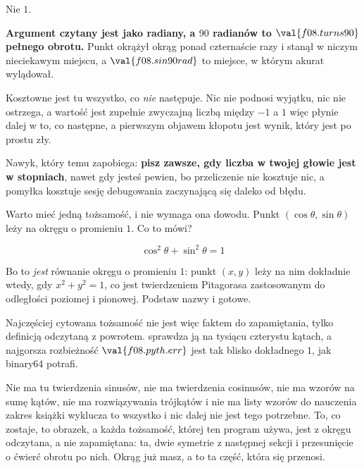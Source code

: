 \begin{fr}
Nie $1$.

\begin{trapbox}
\textbf{Argument czytany jest jako radiany, a $90$ radianów to
$\val{f08.turns90}$ pełnego obrotu.} Punkt okrążył okrąg ponad czternaście
razy i stanął w niczym nieciekawym miejscu, a $\val{f08.sin90rad}$ to
miejsce, w którym akurat wylądował.

Kosztowne jest tu wszystko, co \emph{nie} następuje. Nic nie podnosi wyjątku,
nic nie ostrzega, a wartość jest zupełnie zwyczajną liczbą między $-1$ a $1$
\dash{} więc płynie dalej w to, co następne, a pierwszym objawem kłopotu jest
wynik, który jest po prostu zły.

Nawyk, który temu zapobiega: \textbf{pisz  zawsze, gdy
liczba w twojej głowie jest w stopniach}, nawet gdy jesteś pewien, bo
przeliczenie nie kosztuje nic, a pomyłka kosztuje sesję debugowania
zaczynającą się daleko od błędu.

\end{trapbox}

Warto mieć jedną tożsamość, i nie wymaga ona dowodu. Punkt $(\cos\theta,
\sin\theta)$ leży na okręgu o promieniu $1$. Co to mówi?
\nextframe
\end{fr}

\begin{fr}
\begin{ansblock}
\[ \cos^{2}\theta + \sin^{2}\theta = 1 \]
\end{ansblock}

Bo to \emph{jest} równanie okręgu o promieniu $1$: punkt $(x, y)$ leży na nim
dokładnie wtedy, gdy $x^{2} + y^{2} = 1$, co jest twierdzeniem Pitagorasa
zastosowanym do odległości poziomej i pionowej. Podstaw nazwy i gotowe.

Najczęściej cytowana tożsamość nie jest więc faktem do zapamiętania, tylko
definicją odczytaną z powrotem.
 sprawdza ją na tysiącu czterystu kątach, a
najgorsza rozbieżność $\val{f08.pyth.err}$ jest tak blisko dokładnego $1$, jak
binary64 potrafi.

\begin{note}
Nie ma tu twierdzenia sinusów, nie ma twierdzenia cosinusów, nie ma wzorów na
sumę kątów, nie ma rozwiązywania trójkątów i nie ma listy wzorów do nauczenia
\dash{} zakres książki wyklucza to wszystko i nic dalej nie jest tego
potrzebne. To, co zostaje, to obrazek, a każda tożsamość, której ten program
używa, jest z okręgu odczytana, a nie zapamiętana: ta, dwie symetrie z
następnej sekcji i przesunięcie o ćwierć obrotu po nich. Okrąg już masz, a to
ta część, która się przenosi.
\end{note}

\end{fr}

